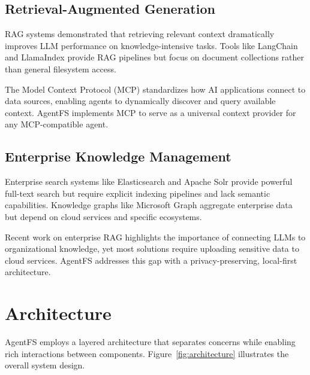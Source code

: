 \documentclass[conference]{IEEEtran}
\begin{document}
\subsection{Retrieval-Augmented Generation}

RAG systems \cite{lewis2020retrieval} demonstrated that retrieving relevant context dramatically improves LLM performance on knowledge-intensive tasks. Tools like LangChain and LlamaIndex provide RAG pipelines but focus on document collections rather than general filesystem access.

The Model Context Protocol (MCP) \cite{anthropic2024mcp} standardizes how AI applications connect to data sources, enabling agents to dynamically discover and query available context. AgentFS implements MCP to serve as a universal context provider for any MCP-compatible agent.

\subsection{Enterprise Knowledge Management}

Enterprise search systems like Elasticsearch and Apache Solr provide powerful full-text search but require explicit indexing pipelines and lack semantic capabilities. Knowledge graphs like Microsoft Graph aggregate enterprise data but depend on cloud services and specific ecosystems.

Recent work on enterprise RAG \cite{gao2023retrieval} highlights the importance of connecting LLMs to organizational knowledge, yet most solutions require uploading sensitive data to cloud services. AgentFS addresses this gap with a privacy-preserving, local-first architecture.

\section{Architecture}

AgentFS employs a layered architecture that separates concerns while enabling rich interactions between components. Figure~\ref{fig:architecture} illustrates the overall system design.
\end{document}
